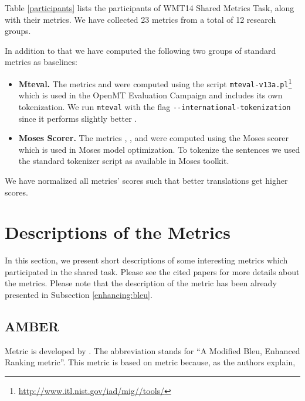 Table \ref{participants} lists the participants of WMT14 Shared Metrics Task,
along with their metrics. We have collected 23 metrics from a total of
12 research groups.

In addition to that we have computed the following two groups of standard
metrics as baselines: 

\begin{itemize}

\item \textbf{Mteval.} The metrics   and
      were computed using the script
    \texttt{mteval-v13a.pl}\footnote{\url{http://www.itl.nist.gov/iad/mig//tools/}}
    which is used in the OpenMT Evaluation Campaign and includes its own
    tokenization.  We run \texttt{mteval} with the flag
    \texttt{-{}-international-tokenization} since it performs slightly better
    .

\item \textbf{Moses Scorer.} The metrics  ,
    ,  and  
    were computed using the Moses scorer which is used in Moses model
    optimization. To tokenize the sentences we used the standard tokenizer
    script as available in Moses toolkit.


\end{itemize}

We have normalized all metrics' scores such that better translations get higher scores. 

\section{Descriptions of the Metrics}
\label{section:metrics:description}

In this section, we present short descriptions of some interesting metrics which
participated in the shared task.  Please see the cited papers for more details
about the metrics. Please note that the description of the  metric
has been already presented in Subsection \ref{enhancing:bleu}.

\subsection{AMBER}

Metric  is developed by . The abbreviation 
stands for ``A Modified Bleu, Enhanced Ranking metric''. This metric is based
on  metric because, as the authors explain, 

